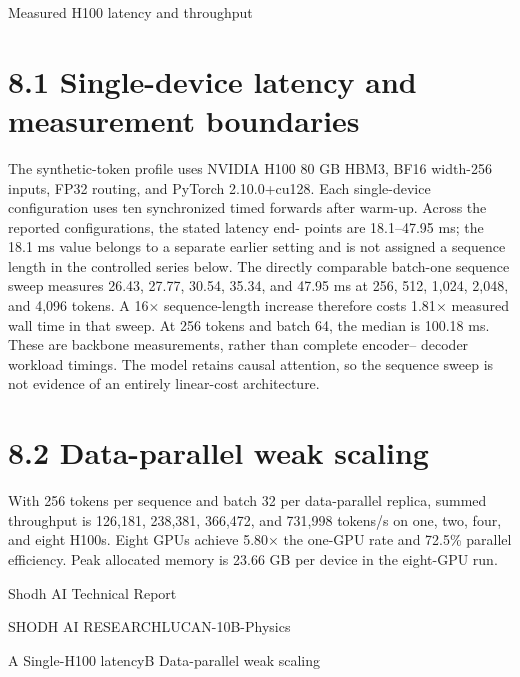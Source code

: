 \documentclass[11pt]{article}
\begin{document}
Measured H100 latency and throughput


\section*{8.1 Single-device latency and measurement boundaries}

The synthetic-token profile uses NVIDIA H100 80 GB HBM3, BF16 width-256 inputs, FP32
routing, and PyTorch 2.10.0+cu128. Each single-device configuration uses ten synchronized
timed forwards after warm-up. Across the reported configurations, the stated latency end-
points are 18.1–47.95 ms; the 18.1 ms value belongs to a separate earlier setting and is
not assigned a sequence length in the controlled series below.
The directly comparable batch-one sequence sweep measures 26.43, 27.77, 30.54, 35.34,
and 47.95 ms at 256, 512, 1,024, 2,048, and 4,096 tokens. A 16\ensuremath{\times} sequence-length increase
therefore costs 1.81\ensuremath{\times} measured wall time in that sweep. At 256 tokens and batch 64, the
median is 100.18 ms. These are backbone measurements, rather than complete encoder–
decoder workload timings. The model retains causal attention, so the sequence sweep is not
evidence of an entirely linear-cost architecture.

\section*{8.2 Data-parallel weak scaling}

With 256 tokens per sequence and batch 32 per data-parallel replica, summed throughput
is 126,181, 238,381, 366,472, and 731,998 tokens/s on one, two, four, and eight H100s.
Eight GPUs achieve 5.80\ensuremath{\times} the one-GPU rate and 72.5\% parallel efficiency. Peak allocated
memory is 23.66 GB per device in the eight-GPU run.





\noindent Shodh AI Technical Report\par




\noindent SHODH AI RESEARCH\quad LUCAN-10B-Physics\par






\noindent A Single-H100 latency\quad B Data-parallel weak scaling\par
\end{document}
